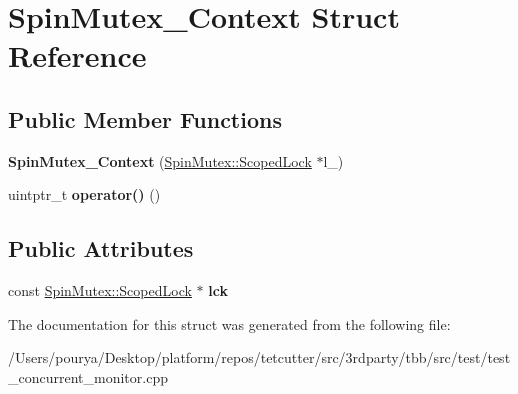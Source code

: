 \hypertarget{structSpinMutex__Context}{}\section{Spin\+Mutex\+\_\+\+Context Struct Reference}
\label{structSpinMutex__Context}
\subsection*{Public Member Functions}
\begin{DoxyCompactItemize}
\item 
\hypertarget{structSpinMutex__Context_a51c523793c92044bb8fa34015258bb4b}{}{\bfseries Spin\+Mutex\+\_\+\+Context} (\hyperlink{classSpinMutex_1_1ScopedLock}{Spin\+Mutex\+::\+Scoped\+Lock} $\ast$l\+\_\+)\label{structSpinMutex__Context_a51c523793c92044bb8fa34015258bb4b}

\item 
\hypertarget{structSpinMutex__Context_a327954bd7055c3390e82b7aa850d9342}{}uintptr\+\_\+t {\bfseries operator()} ()\label{structSpinMutex__Context_a327954bd7055c3390e82b7aa850d9342}

\end{DoxyCompactItemize}
\subsection*{Public Attributes}
\begin{DoxyCompactItemize}
\item 
\hypertarget{structSpinMutex__Context_a72f7979e20ee46c252bc685bf7168114}{}const \hyperlink{classSpinMutex_1_1ScopedLock}{Spin\+Mutex\+::\+Scoped\+Lock} $\ast$ {\bfseries lck}\label{structSpinMutex__Context_a72f7979e20ee46c252bc685bf7168114}

\end{DoxyCompactItemize}


The documentation for this struct was generated from the following file\+:\begin{DoxyCompactItemize}
\item 
/\+Users/pourya/\+Desktop/platform/repos/tetcutter/src/3rdparty/tbb/src/test/test\+\_\+concurrent\+\_\+monitor.\+cpp\end{DoxyCompactItemize}
